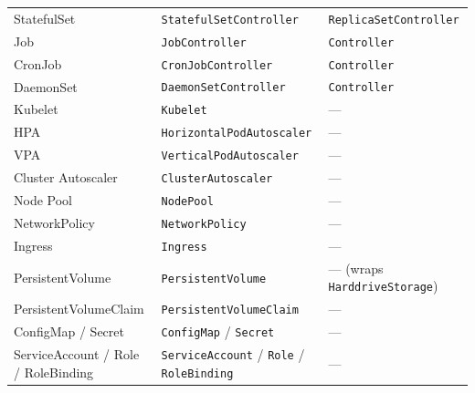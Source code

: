 \documentclass[ASNA,twocolumn]{USG}
\begin{document}
\begin{table}[tp]
\begin{tabular*}{\textwidth}{@{\extracolsep{\fill}}lll@{}}
StatefulSet            & \texttt{StatefulSetController}      & \texttt{ReplicaSetController} \\
Job                    & \texttt{JobController}              & \texttt{Controller} \\
CronJob                & \texttt{CronJobController}          & \texttt{Controller} \\
DaemonSet              & \texttt{DaemonSetController}        & \texttt{Controller} \\
Kubelet                & \texttt{Kubelet}                    & --- \\
HPA                    & \texttt{HorizontalPodAutoscaler}    & --- \\
VPA                    & \texttt{VerticalPodAutoscaler}      & --- \\
Cluster Autoscaler     & \texttt{ClusterAutoscaler}          & --- \\
Node Pool              & \texttt{NodePool}                   & --- \\
NetworkPolicy          & \texttt{NetworkPolicy}              & --- \\
Ingress                & \texttt{Ingress}                    & --- \\
PersistentVolume       & \texttt{PersistentVolume}           & --- (wraps \texttt{HarddriveStorage}) \\
PersistentVolumeClaim  & \texttt{PersistentVolumeClaim}      & --- \\
ConfigMap / Secret     & \texttt{ConfigMap} / \texttt{Secret} & --- \\
ServiceAccount / Role / RoleBinding & \texttt{ServiceAccount} / \texttt{Role} / \texttt{RoleBinding} & --- \\
\bottomrule
        \end{tabular*}
    \end{table}
\end{document}
